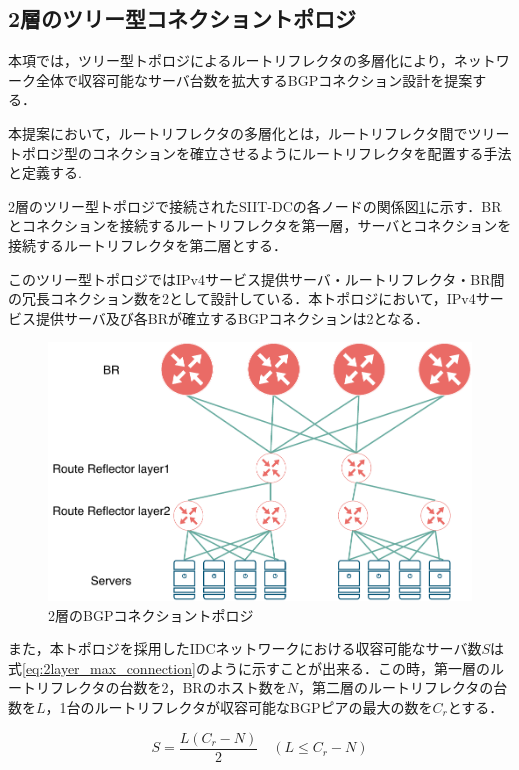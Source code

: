 \subsection{2層のツリー型コネクショントポロジ}
\label{conclusion:tree:2layer}
本項では，ツリー型トポロジによるルートリフレクタの多層化により，ネットワーク全体で収容可能なサーバ台数を拡大するBGPコネクション設計を提案する．

本提案において，ルートリフレクタの多層化とは，ルートリフレクタ間でツリートポロジ型のコネクションを確立させるようにルートリフレクタを配置する手法と定義する.

2層のツリー型トポロジで接続されたSIIT-DCの各ノードの関係図\ref{fig:2layer_bgp_topology}に示す．BRとコネクションを接続するルートリフレクタを第一層，サーバとコネクションを接続するルートリフレクタを第二層とする．

このツリー型トポロジではIPv4サービス提供サーバ・ルートリフレクタ・BR間の冗長コネクション数を2として設計している．本トポロジにおいて，IPv4サービス提供サーバ及び各BRが確立するBGPコネクションは2となる．

\begin{figure}[h]
    \begin{center}
    \includegraphics[width=12cm,pagebox=cropbox,clip]{img/2layer_bgp_topology_more_scale.pdf}
    \end{center}
    \caption{2層のBGPコネクショントポロジ}
    \label{fig:2layer_bgp_topology}
\end{figure}


また，本トポロジを採用したIDCネットワークにおける収容可能なサーバ数$S$は式\ref{eq:2layer_max_connection}のように示すことが出来る．この時，第一層のルートリフレクタの台数を2，BRのホスト数を$N$，第二層のルートリフレクタの台数を$L$，1台のルートリフレクタが収容可能なBGPピアの最大の数を$C_r$とする．


\begin{equation}
    S = \frac{L(C_r - N)}{2} \quad (L \leq C_r - N)
    \label{eq:2layer_max_connection}
\end{equation}


